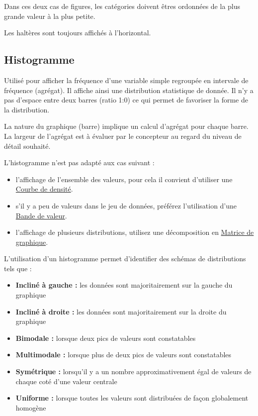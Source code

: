 \documentclass[a4paper,12pt]{article}
\begin{document}
\begin{multicols}{2}
Dans ces deux cas de figures, les catégories doivent êtres ordonnées de la plus grande valeur à la plus petite.

Les haltères sont toujours affichés à l'horizontal.
\subsection*{Histogramme}
\label{sec:org9e7151a}
Utilisé pour afficher la fréquence d'une variable simple regroupée en intervale de fréquence (agrégat).\autocite{sosulskiGraphics2019} Il affiche ainsi une distribution statistique de donnée. Il n'y a pas d'espace entre deux barres (ratio 1:0) ce qui permet de favoriser la forme de la distribution. \autocite{alansmithLexiqueVisuel}

La nature du graphique (barre) implique un calcul d'agrégat pour chaque barre. \autocite{wilkeVisualizingDistributionsHistograms2019} La largeur de l'agrégat est à évaluer par le concepteur au regard du niveau de détail souhaité.\autocite{wilkeVisualizingDistributionsHistograms2019}

L'histogramme n'est pas adapté aux cas suivant :
\begin{itemize}
\item l'affichage de l'ensemble des valeurs, pour cela il convient d'utiliser une \hyperref[sec:orgb92f5a3]{Courbe de densité}. \autocite{wilkeVisualizingDistributionsHistograms2019}
\item s'il y a peu de valeurs dans le jeu de données, \autocite{weissgerberBarLineGraphs2015} préférez l'utilisation d'une \hyperref[sec:orgc561940]{Bande de valeur}.
\item l'affichage de plusieurs distributions,\autocite{wilkeVisualizingDistributionsHistograms2019} utilisez une décomposition en \hyperref[sec:org520b4af]{Matrice de graphique}.
\end{itemize}

L'utilisation d'un histogramme permet d'identifier des schémas de distributions tels que : \autocite{jonathanschwabishDistribution2021}
\begin{itemize}
\item \textbf{Incliné à gauche :} les données sont majoritairement sur la gauche du graphique
\item \textbf{Incliné à droite :} les données sont majoritairement sur la droite du graphique
\item \textbf{Bimodale :} lorsque deux pics de valeurs sont constatables
\item \textbf{Multimodale :} lorsque plus de deux pics de valeurs sont constatables
\item \textbf{Symétrique :} lorsqu'il y a un nombre approximativement égal de valeurs de chaque coté d'une valeur centrale
\item \textbf{Uniforme :} lorsque toutes les valeurs sont distribuées de façon globalement homogène
\end{itemize}

\end{multicols}
\end{document}
